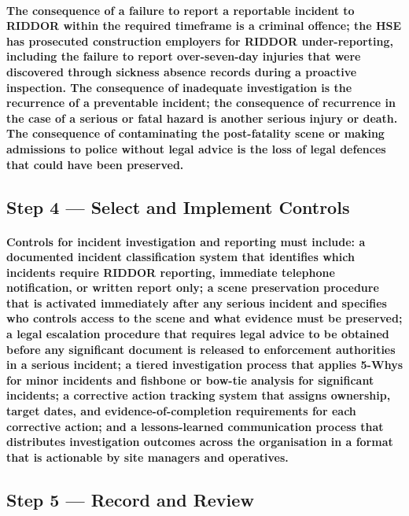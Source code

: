 {\paragraph{The consequence of a failure to report a reportable incident to RIDDOR within the required timeframe is a criminal offence; the HSE has prosecuted construction employers for RIDDOR under-reporting, including the failure to report over-seven-day injuries that were discovered through sickness absence records during a proactive inspection. The consequence of inadequate investigation is the recurrence of a preventable incident; the consequence of recurrence in the case of a serious or fatal hazard is another serious injury or death. The consequence of contaminating the post-fatality scene or making admissions to police without legal advice is the loss of legal defences that could have been preserved.}

\subsection{Step 4 --- Select and Implement Controls}
\paragraph{Controls for incident investigation and reporting must include: a documented incident classification system that identifies which incidents require RIDDOR reporting, immediate telephone notification, or written report only; a scene preservation procedure that is activated immediately after any serious incident and specifies who controls access to the scene and what evidence must be preserved; a legal escalation procedure that requires legal advice to be obtained before any significant document is released to enforcement authorities in a serious incident; a tiered investigation process that applies 5-Whys for minor incidents and fishbone or bow-tie analysis for significant incidents; a corrective action tracking system that assigns ownership, target dates, and evidence-of-completion requirements for each corrective action; and a lessons-learned communication process that distributes investigation outcomes across the organisation in a format that is actionable by site managers and operatives.}

\subsection{Step 5 --- Record and Review}
}

